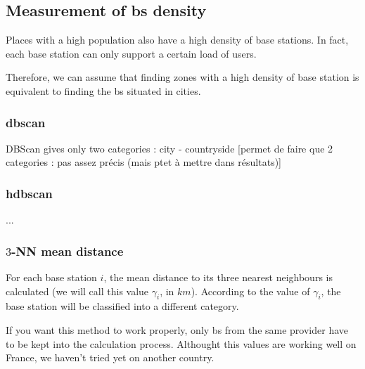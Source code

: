 \documentclass[lettersize,journal,english]{IEEEtran}
\begin{document}
\subsection{Measurement of \acrshort{bs} density}
Places with a high population also have a high density of base stations. In fact, each base station can only support a certain
load of users.

Therefore, we can assume that finding zones with a high density of base station is equivalent to finding the \acrshort{bs} 
situated in \og cities\fg{}.

\subsubsection{\acrshort{dbscan}}
DBScan gives only two categories : city - countryside
[permet de faire que 2 categories : pas assez précis (mais ptet à mettre dans résultats)]


\subsubsection{\acrshort{hdbscan}}
...

\subsubsection{$3$-NN mean distance}
For each base station $i$, the mean distance to its three nearest neighbours is calculated (we will call this value $\gamma_i$, in 
$\unit{km}$). According to the value of $\gamma_i$, the base station will be classified into a different category.

If you want this method to work properly, only \acrshort{bs} from the same provider have to be kept into the calculation process.
Althought this values are working well on France, we haven't tried yet on another country.

\end{document}
